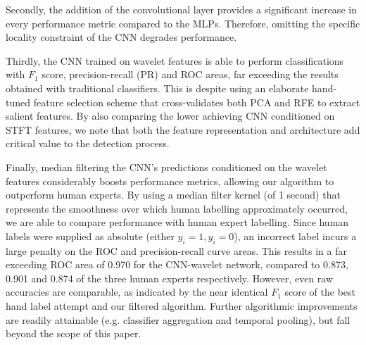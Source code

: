 \documentclass[10pt, twocolumn]{llncs}
\begin{document}
Secondly, the addition of the convolutional layer provides a significant increase in every performance metric compared to the MLPs. Therefore, omitting the specific locality constraint of the CNN degrades performance.

Thirdly, the CNN trained on wavelet features is able to perform classifications  with $F_1$ score, precision-recall (PR) and ROC areas, far exceeding the results obtained with traditional classifiers. This is despite using an elaborate hand-tuned feature selection scheme that cross-validates both PCA and RFE to extract salient features. By also comparing the lower achieving CNN conditioned on STFT features, we note that both the feature representation and architecture add critical value to the detection process. 

Finally, median filtering the CNN's predictions conditioned on the wavelet features considerably boosts performance metrics, allowing our algorithm to outperform human experts. By using a median filter kernel (of 1 second) that represents the smoothness over which human labelling approximately occurred, we are able to compare performance with human expert labelling. Since human labels were supplied as absolute (either  $y_i = 1, y_i = 0$), an incorrect label incurs a large penalty on the ROC and precision-recall curve areas. This results in a far exceeding ROC area of 0.970 for the CNN-wavelet network, compared to 0.873, 0.901 and 0.874 of the three human experts respectively. However, even raw accuracies are comparable, as indicated by the near identical $F_1$ score of the best hand label attempt and our filtered algorithm. Further algorithmic improvements are readily attainable (e.g. classifier aggregation and temporal pooling), but fall beyond the scope of this paper.


\end{document}
